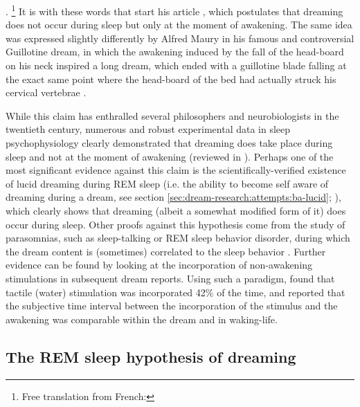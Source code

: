 . \footnote{Free translation from French: } It is with these words that \citet{goblot_souvenir_1896} start his article , which postulates that dreaming does not occur during sleep but only at the moment of awakening. The same idea was expressed slightly differently by Alfred Maury in his famous and controversial Guillotine dream, in which the awakening induced by the fall of the head-board on his neck inspired a long dream, which ended with a guillotine blade falling at the exact same point where the head-board of the bed had actually struck his cervical vertebrae \citep{maury_sommeil_1865}.

While this claim has enthralled several philosophers and neurobiologists in the twentieth century, numerous and robust experimental data in sleep psychophysiology clearly demonstrated that dreaming does take place during sleep and not at the moment of awakening (reviewed in \citealp{guenole_reve_2010}). Perhaps one of the most significant evidence against this claim is the scientifically-verified existence of lucid dreaming during REM sleep (i.e. the ability to become self aware of dreaming during a dream, see section \ref{sec:dream-research:attempts:ba-lucid}; \citealp{laberge_exploring_1991, dresler_neural_2012}), which clearly shows that dreaming (albeit a somewhat modified form of it) does occur during sleep. Other proofs against this hypothesis come from the study of parasomnias, such as sleep-talking or REM sleep behavior disorder, during which the dream content is (sometimes) correlated to the sleep behavior \citep{ellman_mind_1991, schenck_rem_2002, leclair-visonneau_eyes_2010}. Further evidence can be found by looking at the incorporation of non-awakening stimulations in subsequent dream reports. Using such a paradigm, \citet{dement_relation_1958} found that tactile (water) stimulation was incorporated 42\% of the time, and reported that the subjective time interval between the incorporation of the stimulus and the awakening was comparable within the dream and in waking-life.

\subsection{The REM sleep hypothesis of dreaming}
\label{sec:dream-research:link:rem-sleep}

